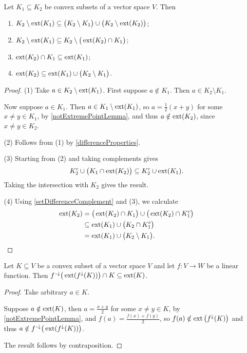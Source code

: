 \begin{lemma} \label{extremePointsSubset}
Let $K_1 \subseteq K_2$ be convex subsets of a vector space $V$. Then
\begin{enumerate}
\item $K_2\setminus \operatorname{ext}(K_1) \subseteq \big(K_2\setminus K_1\big) \cup \big(K_2 \setminus \operatorname{ext}(K_2)\big)$;
\item $K_2\setminus \operatorname{ext}(K_1) \subseteq K_2\setminus \big(\operatorname{ext}(K_2)\cap K_1\big)$;
\item $\operatorname{ext}(K_2)\cap K_1 \subseteq \operatorname{ext}(K_1)$;
\item $\operatorname{ext}(K_2) \subseteq \operatorname{ext}(K_1) \cup \big(K_2\setminus K_1\big)$.
\end{enumerate}
\end{lemma}
\begin{proof}
(1) Take $a\in K_2\setminus \operatorname{ext}(K_1)$. First suppose $a\notin K_1$. Then $a\in K_2\setminus K_1$.

Now suppose $a\in K_1$. Then $a\in K_1\setminus \operatorname{ext}(K_1)$, so $a = \frac{1}{2}(x+y)$ for some $x\neq y\in K_1$, by \ref{notExtremePointLemma}, and thus $a\notin \operatorname{ext}(K_2)$, since $x\neq y \in K_2$. 

(2) Follows from (1) by \ref{differenceProperties}.

(3) Starting from (2) and taking complements gives
\[ K_2^c \cup \big(K_1 \cap \operatorname{ext}(K_2)\big) \subseteq K_2^c \cup \operatorname{ext}(K_1). \]
Taking the intersection with $K_2$ gives the result.

(4) Using \ref{setDifferenceComplement} and (3), we calculate
\begin{align*}
\operatorname{ext}(K_2) &= \big(\operatorname{ext}(K_2) \cap K_1\big) \cup \big(\operatorname{ext}(K_2) \cap K_1^c\big) \\
&\subseteq \operatorname{ext}(K_1) \cup \big(K_2 \cap K_1^c\big) \\
&= \operatorname{ext}(K_1) \cup \big(K_2\setminus K_1\big).
\end{align*}
\end{proof}

\begin{lemma}
Let $K\subseteq V$ be a convex subset of a vector space $V$ and let $f: V\to W$ be a linear function. Then $f^{\text{\hspace{0.15em}-}\downarrow}\big(\operatorname{ext}(f^\downarrow(K))\big) \cap K \subseteq \operatorname{ext}(K)$.
\end{lemma}
\begin{proof}
Take arbitrary $a\in K$.

Suppose $a\notin \operatorname{ext}(K)$, then $a = \frac{x+y}{2}$ for some $x\neq y \in K$, by \ref{notExtremePointLemma}, and $f(a) = \frac{f(x)+f(y)}{2}$, so $f(a)\notin \operatorname{ext}\big(f^\downarrow(K)\big)$ and thus $a\notin f^{\text{\hspace{0.15em}-}\downarrow}\big(\operatorname{ext}(f^\downarrow(K))\big)$.

The result follows by contraposition.
\end{proof}

